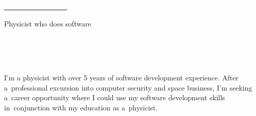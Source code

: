 \documentclass[10pt]{developercv} %
\begin{document}

\begin{minipage}[t]{0.7\textwidth} %
	\vspace{-\baselineskip} %
	
	\colorbox{COLOR_1}{\href{https://www.linkedin.com/in/marcin-kruk-a5486111a/}{{\HUGE\textcolor{white}{\textbf{\MakeUppercase{Marcin Kruk}}}}}} %
	
	\vspace{10pt}
	
	{\huge Physicist who does software} %
\end{minipage}
\begin{minipage}[t]{0.3\textwidth}
	\vspace{-\baselineskip} %
	
	\\
	\\
	\\
\end{minipage}

\vspace{0.5cm}


    I'm a physicist with over 5 years of software development experience. After a~professional excursion into computer security and space business, I'm seeking a~career opportunity where I could use my software development skills in~conjunction with my education as a~physicist.
\end{document}
